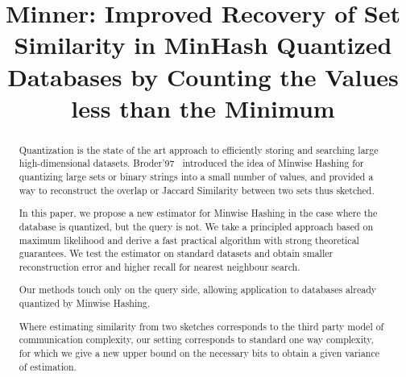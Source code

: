 
\title{Minner: Improved Recovery of Set Similarity in MinHash Quantized Databases by Counting the Values less than the Minimum}

\begin{abstract}
   Quantization is the state of the art approach to efficiently storing and searching large high-dimensional datasets.
   Broder'97~\cite{broder1997resemblance} introduced the idea of Minwise Hashing for quantizing large sets or binary strings into a small number of values, and provided a way to reconstruct the overlap or Jaccard Similarity between two sets thus sketched.

   In this paper, we propose a new estimator for Minwise Hashing in the case where the database is quantized, but the query is not.
   We take a principled approach based on maximum likelihood and derive a fast practical algorithm with strong theoretical guarantees.
   We test the estimator on standard datasets and obtain smaller reconstruction error and higher recall for nearest neighbour search.

   Our methods touch only on the query side, allowing application to databases already quantized by Minwise Hashing.

   Where estimating similarity from two sketches corresponds to the third party model of communication complexity, our setting corresponds to standard one way complexity, for which we give a new upper bound on the necessary bits to obtain a given variance of estimation.



%
%
\end{abstract}

